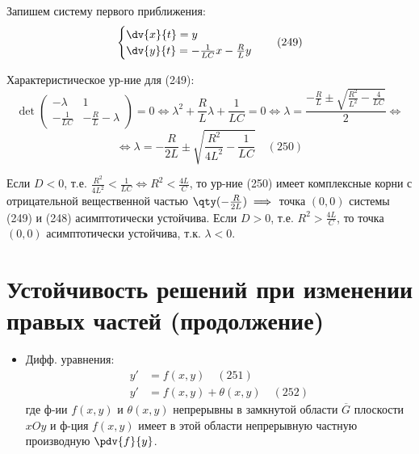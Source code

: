 \noindent Запишем систему первого приближения:
\begin{equation} \label{eq:249_new}
	\begin{cases}
		\dv{x}{t} = y \\
		\dv{y}{t} = -\frac{1}{LC}x - \frac{R}{L}y
	\end{cases} \quad (249)
\end{equation}

Характеристическое ур-ние для (249): 
\begin{equation*}
	\det \begin{pmatrix} -\lambda & 1 \\ -\frac{1}{LC} & -\frac{R}{L} - \lambda \end{pmatrix} = 0 \iff \lambda^2 + \frac{R}{L}\lambda + \frac{1}{LC} = 0 \iff \lambda = \frac{-\frac{R}{L} \pm \sqrt{\frac{R^2}{L^2} - \frac{4}{LC}}}{2} \iff
\end{equation*}
\begin{equation} \label{eq:250_new}
	\iff \lambda = -\frac{R}{2L} \pm \sqrt{\frac{R^2}{4L^2} - \frac{1}{LC}} \quad (250)
\end{equation}

Если $D < 0$, т.е. $\frac{R^2}{4L^2} < \frac{1}{LC} \iff R^2 < \frac{4L}{C}$, то ур-ние (250) имеет комплексные корни с отрицательной вещественной частью $\qty(-\frac{R}{2L}) \implies$ точка $(0,0)$ системы (249) и (248) асимптотически устойчива. Если $D > 0$, т.е. $R^2 > \frac{4L}{C}$, то точка $(0,0)$ асимптотически устойчива, т.к. $\lambda < 0$.

\section{Устойчивость решений при изменении правых частей (продолжение)}

\begin{itemize}
	\item Дифф. уравнения:
	\begin{align}
		y' &= f(x,y) \quad (251) \label{eq:251_new} \\
		y' &= f(x,y) + \theta(x,y) \quad (252) \label{eq:252_new}
	\end{align}
	где ф-ии $f(x,y)$ и $\theta(x,y)$ непрерывны в замкнутой области $\overline{G}$ плоскости $xOy$ и ф-ция $f(x,y)$ имеет в этой области непрерывную частную производную $\pdv{f}{y}$.
\end{itemize}

